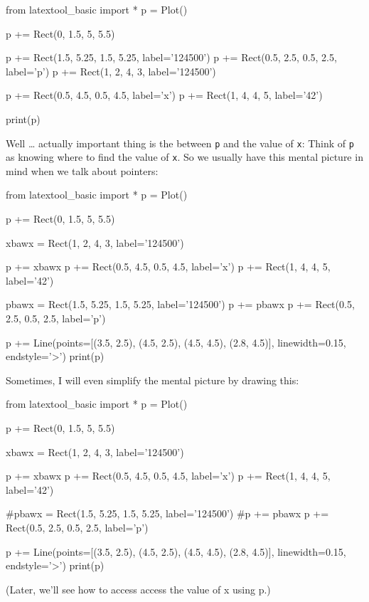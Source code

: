 \begin{python}
from latextool_basic import *
p = Plot()

p += Rect(0, 1.5, 5, 5.5)

p += Rect(1.5, 5.25, 1.5, 5.25, label='124500')
p += Rect(0.5, 2.5, 0.5, 2.5, label='p')
p += Rect(1, 2, 4, 3, label='124500')

p += Rect(0.5, 4.5, 0.5, 4.5, label='x')
p += Rect(1, 4, 4, 5, label='42')

print(p)
\end{python}

Well \ldots{} actually important thing is the  between \texttt{p} and the value of \texttt{x}: Think of \texttt{p} as knowing where to find the value of \texttt{x}. So we usually have this mental picture in mind when we talk about pointers:

\begin{python}
from latextool_basic import *
p = Plot()

p += Rect(0, 1.5, 5, 5.5)

xbawx = Rect(1, 2, 4, 3, label='124500')

p += xbawx
p += Rect(0.5, 4.5, 0.5, 4.5, label='x')
p += Rect(1, 4, 4, 5, label='42')

pbawx = Rect(1.5, 5.25, 1.5, 5.25, label='124500')
p += pbawx
p += Rect(0.5, 2.5, 0.5, 2.5, label='p')

p += Line(points=[(3.5, 2.5), (4.5, 2.5), (4.5, 4.5), (2.8, 4.5)], linewidth=0.15, endstyle='>')
print(p)
\end{python}

Sometimes, I will even simplify the mental picture by drawing this:

\begin{python}
from latextool_basic import *
p = Plot()

p += Rect(0, 1.5, 5, 5.5)

xbawx = Rect(1, 2, 4, 3, label='124500')

p += xbawx
p += Rect(0.5, 4.5, 0.5, 4.5, label='x')
p += Rect(1, 4, 4, 5, label='42')

#pbawx = Rect(1.5, 5.25, 1.5, 5.25, label='124500')
#p += pbawx
p += Rect(0.5, 2.5, 0.5, 2.5, label='p')

p += Line(points=[(3.5, 2.5), (4.5, 2.5), (4.5, 4.5), (2.8, 4.5)], linewidth=0.15, endstyle='>')
print(p)
\end{python}

(Later, we'll see how to access access the value of x using p.)

